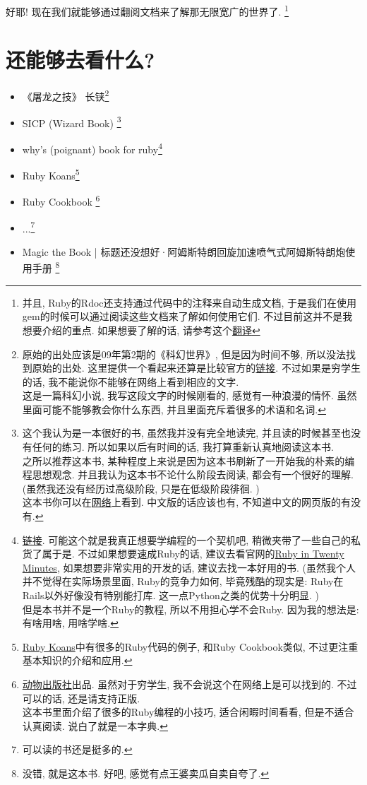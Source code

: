 好耶! 现在我们就能够通过翻阅文档来了解那无限宽广的世界了. \footnote{并且, Ruby的Rdoc还支持通过代码中的注释来自动生成文档, 于是我们在使用gem的时候可以通过阅读这些文档来了解如何使用它们. 不过目前这并不是我想要介绍的重点. 如果想要了解的话, 请参考这个\href{https://li-yiyang.github.io/ruby/why's_(poignant)_guide_to_ruby/why's-poignant-guide/}{翻译}}

\section{还能够去看什么? }
\begin{itemize}
  \item 《屠龙之技》 长铗\footnote{原始的出处应该是09年第2期的《科幻世界》, 但是因为时间不够, 所以没法找到原始的出处. 这里提供一个看起来还算是比较官方的\href{https://www.zhihu.com/xen/market/remix/paid_column/1439565482748272640}{链接}. 不过如果是穷学生的话, 我不能说你不能够在网络上看到相应的文字. \\这是一篇科幻小说, 我写这段文字的时候刚看的, 感觉有一种浪漫的情怀. 虽然里面可能不能够教会你什么东西, 并且里面充斥着很多的术语和名词. }
  \item SICP (Wizard Book) \footnote{这个我认为是一本很好的书, 虽然我并没有完全地读完, 并且读的时候甚至也没有任何的练习. 所以如果以后有时间的话, 我打算重新认真地阅读这本书. \\之所以推荐这本书, 某种程度上来说是因为这本书刷新了一开始我的朴素的编程思想观念. 并且我认为这本书不论什么阶段去阅读, 都会有一个很好的理解. (虽然我还没有经历过高级阶段, 只是在低级阶段徘徊. )\\这本书你可以在\href{https://mitpress.mit.edu/sites/default/files/sicp/index.html}{网络}上看到. 中文版的话应该也有, 不知道中文的网页版的有没有. }
  \item why's (poignant) book for ruby\footnote{\href{https://poignant.guide}{链接}. 可能这个就是我真正想要学编程的一个契机吧, 稍微夹带了一些自己的私货了属于是. 不过如果想要速成Ruby的话, 建议去看官网的\href{https://www.ruby-lang.org/en/documentation/quickstart/}{Ruby in Twenty Minutes}, 如果想要非常实用的开发的话, 建议去找一本好用的书. (虽然我个人并不觉得在实际场景里面, Ruby的竞争力如何, 毕竟残酷的现实是: Ruby在Rails以外好像没有特别能打库. 这一点Python之类的优势十分明显. )\\但是本书并不是一个Ruby的教程, 所以不用担心学不会Ruby. 因为我的想法是: 有啥用啥, 用啥学啥. }
  \item Ruby Koans\footnote{\href{http://rubykoans.com}{Ruby Koans}中有很多的Ruby代码的例子, 和Ruby Cookbook类似, 不过更注重基本知识的介绍和应用. }
  \item Ruby Cookbook \footnote{\href{http://www.oreilly.com/catalog/rubyckbk/}{动物出版社}出品. 虽然对于穷学生, 我不会说这个在网络上是可以找到的. 不过可以的话, 还是请支持正版. \\这本书里面介绍了很多的Ruby编程的小技巧, 适合闲暇时间看看, 但是不适合认真阅读. 说白了就是一本字典. }
  \item ...\footnote{可以读的书还是挺多的. }
  \item Magic the Book | 标题还没想好·阿姆斯特朗回旋加速喷气式阿姆斯特朗炮使用手册 \footnote{没错, 就是这本书. 好吧, 感觉有点王婆卖瓜自卖自夸了. }
\end{itemize}